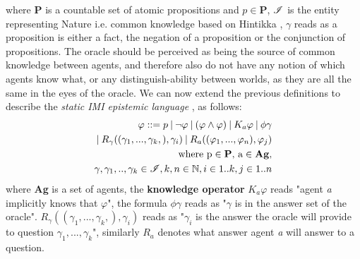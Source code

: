where \textbf{P} is a countable set of atomic propositions and $p \in
	\mathbf{P}$, $\mathscr{I}$ is the entity representing Nature i.e. common knowledge
based on Hintikka \cite{hintikka88}, $\gamma$ reads as a proposition is either
a fact, the negation of a proposition or the conjunction of propositions. The oracle should be perceived as being the source of common knowledge between agents, and therefore also do not have any notion of which agents know what, or any distinguish-ability between worlds, as they are all the same in the eyes of the oracle.
We can now extend the previous definitions to describe the \textit{static IMI
	epistemic language} \staticlang, as follows:
\begin{align}
	\begin{split}
		\varphi ::= p \:|\:\neg\varphi\:|\:(\varphi \land \varphi) \:|\: K_a\varphi \:|\: \phi\gamma \\ \:|\: R_\gamma((\gamma_1,...,\gamma_k,), \gamma_i) \:|\: R_a((\varphi_1,...,\varphi_n), \varphi_j) \\ \text{where p} \in \text{\textbf{P}}\text{, a} \in \text{\textbf{Ag}},\\ \gamma, \gamma_1,..,\gamma_k \in \mathscr{I}, k, n \in \mathbb{N}, i \in 1..k, j \in 1..n
	\end{split}
\end{align}
where \textbf{Ag} is a set of agents, the \textbf{knowledge operator} $K_a\varphi$ reads "agent \textit{a} implicitly knows that $\varphi$", the formula $\phi\gamma$ reads as "$\gamma$ is in the answer set of the oracle". $R_\gamma((\gamma_1,...,\gamma_k,), \gamma_i)$ reads as "$\gamma_i$ is the answer the oracle will provide to question $\gamma_1,...,\gamma_k$", similarly $R_a$ denotes what answer agent \textit{a} will answer to a question. \\

